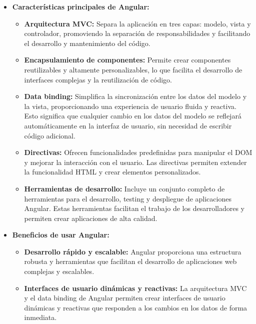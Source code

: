 \begin{itemize}
    \item \textbf{Características principales de Angular:}

    \begin{itemize}

    \item \textbf{Arquitectura MVC:} Separa la aplicación en tres capas: modelo, vista y controlador, promoviendo la separación de responsabilidades y facilitando el desarrollo y mantenimiento del código.

    \item \textbf{Encapsulamiento de componentes:} Permite crear componentes reutilizables y altamente personalizables, lo que facilita el desarrollo de interfaces complejas y la reutilización de código.

    \item \textbf{Data binding:} Simplifica la sincronización entre los datos del modelo y la vista, proporcionando una experiencia de usuario fluida y reactiva. Esto significa que cualquier cambio en los datos del modelo se reflejará automáticamente en la interfaz de usuario, sin necesidad de escribir código adicional.

    \item \textbf{Directivas:} Ofrecen funcionalidades predefinidas para manipular el DOM y mejorar la interacción con el usuario. Las directivas permiten extender la funcionalidad HTML y crear elementos personalizados.

    \item \textbf{Herramientas de desarrollo:} Incluye un conjunto completo de herramientas para el desarrollo, testing y despliegue de aplicaciones Angular. Estas herramientas facilitan el trabajo de los desarrolladores y permiten crear aplicaciones de alta calidad.

    \end{itemize}

    \item \textbf{Beneficios de usar Angular:}

    \begin{itemize}

    \item \textbf{Desarrollo rápido y escalable:} Angular proporciona una estructura robusta y herramientas que facilitan el desarrollo de aplicaciones web complejas y escalables.

    \item \textbf{Interfaces de usuario dinámicas y reactivas:} La arquitectura MVC y el data binding de Angular permiten crear interfaces de usuario dinámicas y reactivas que responden a los cambios en los datos de forma inmediata.


\end{itemize}
\end{itemize}
